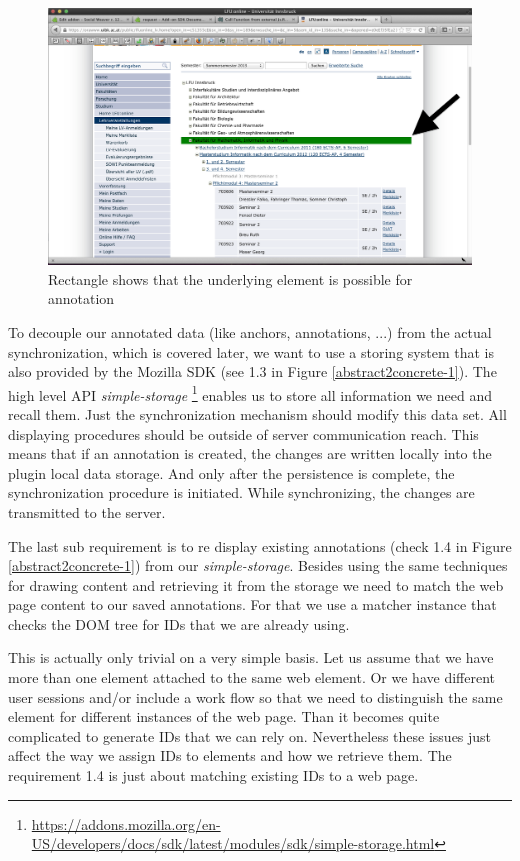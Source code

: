 \begin{figure} \centering
		\includegraphics[width=13cm]{images/annotation-rectangle-sample.png}
		\caption{Rectangle shows that the underlying element is possible for annotation}
		\label{annotation-rectangle-sample}
\end{figure} 

To decouple our annotated data (like anchors, annotations, ...) from the actual synchronization, which is covered later, we want to use a storing system that is also provided by the Mozilla SDK (see 1.3 in Figure \ref{abstract2concrete-1}). The high level API \emph{simple-storage} \footnote{\url{https://addons.mozilla.org/en-US/developers/docs/sdk/latest/modules/sdk/simple-storage.html}} enables us to store all information we need and recall them. Just the synchronization mechanism should modify this data set. All displaying procedures should be outside of server communication reach. This means that if an annotation is created, the changes are written locally into the plugin local data storage. And only after the persistence is complete, the synchronization procedure is initiated. While synchronizing, the changes are transmitted to the server. 

The last sub requirement is to re display existing annotations (check 1.4 in Figure \ref{abstract2concrete-1}) from our \emph{simple-storage}. Besides using the same techniques for drawing content and retrieving it from the storage we need to match the web page content to our saved annotations. For that we use a matcher instance that checks the DOM tree for IDs that we are already using. 

This is actually only trivial on a very simple basis. Let us assume that we have more than one element attached to the same web element. Or we have different user sessions and/or include a work flow so that we need to distinguish the same element for different instances of the web page. Than it becomes quite complicated to generate IDs that we can rely on. Nevertheless these issues just affect the way we assign IDs to elements and how we retrieve them. The requirement 1.4 is just about matching existing IDs to a web page. 

